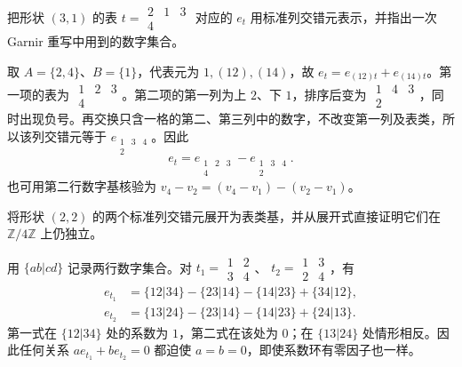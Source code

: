 \begin{exercise}\label{b5:ex:06-garnir-worked}
	把形状 \((3,1)\) 的表
	\(t=\begin{smallmatrix}2&1&3\\4&&\end{smallmatrix}\)
	对应的 \(e_t\) 用标准列交错元表示，并指出一次 Garnir 重写中用到的数字集合。
\end{exercise}
\begin{solution}
	取 \(A=\{2,4\}\)、\(B=\{1\}\)，代表元为 \(1,(12),(14)\)，故 \(e_t=e_{(12)t}+e_{(14)t}\)。第一项的表为
	\(\begin{smallmatrix}1&2&3\\4&&\end{smallmatrix}\)。第二项的第一列为上 \(2\)、下 \(1\)，排序后变为
	\(\begin{smallmatrix}1&4&3\\2&&\end{smallmatrix}\)，同时出现负号。再交换只含一格的第二、第三列中的数字，不改变第一列及表类，所以该列交错元等于
	\(e_{\begin{smallmatrix}1&3&4\\2&&\end{smallmatrix}}\)。因此
	\[
		e_t=e_{\begin{smallmatrix}1&2&3\\4&&\end{smallmatrix}}
		-e_{\begin{smallmatrix}1&3&4\\2&&\end{smallmatrix}}.
	\]
	也可用第二行数字基核验为 \(v_4-v_2=(v_4-v_1)-(v_2-v_1)\)。
\end{solution}

\begin{exercise}\label{b5:ex:06-standard-22-expansion}
	将形状 \((2,2)\) 的两个标准列交错元展开为表类基，并从展开式直接证明它们在 \(\mathbb Z/4\mathbb Z\) 上仍独立。
\end{exercise}
\begin{solution}
	用 \(\{ab|cd\}\) 记录两行数字集合。对
	\(t_1=\begin{smallmatrix}1&2\\3&4\end{smallmatrix}\)、
	\(t_2=\begin{smallmatrix}1&3\\2&4\end{smallmatrix}\)，有
	\[
		\begin{aligned}
			e_{t_1}&=\{12|34\}-\{23|14\}-\{14|23\}+\{34|12\},\\
			e_{t_2}&=\{13|24\}-\{23|14\}-\{14|23\}+\{24|13\}.
		\end{aligned}
	\]
	第一式在 \(\{12|34\}\) 处的系数为 \(1\)，第二式在该处为 \(0\)；在 \(\{13|24\}\) 处情形相反。因此任何关系 \(ae_{t_1}+be_{t_2}=0\) 都迫使 \(a=b=0\)，即使系数环有零因子也一样。
\end{solution}

